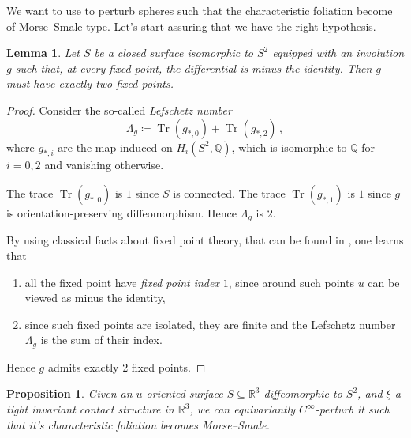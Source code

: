 \documentclass[a4paper, 11pt]{amsart}
\theoremstyle{plain}
\newtheorem{prop}{Proposition}[section]
\newtheorem{lemma}[lemma]{Lemma}
\theoremstyle{definition}
\newcommand{\R}{\mathbb{R}}
\DeclareMathOperator{\Tr}{Tr}
\begin{document}
We want to use  to perturb spheres such that the characteristic foliation become of Morse--Smale type. Let's start assuring that we have the right hypothesis.
\begin{lemma}\label{LefschetzS2}
	Let $S$ be a closed surface isomorphic to $S^2$ equipped with an involution $g$ such that, at every fixed point, the differential is minus the identity. Then $g$ must have exactly two fixed points.
\end{lemma}
\begin{proof}
	Consider the so-called \emph{Lefschetz number}
	\[
		\Lambda_g \coloneqq \Tr(g_{*,0}) + \Tr(g_{*,2})\,,
	\]
	where $g_{*,i}$ are the map induced on $H_i(S^2,\mathbb{Q})$, which is isomorphic to $\mathbb{Q}$ for $i = 0,2$ and vanishing otherwise.
	
	The trace $\Tr(g_{*,0})$ is $1$ since $S$ is connected. The trace $\Tr(g_{*,1})$ is $1$ since $g$ is orientation-preserving diffeomorphism. Hence $\Lambda_g$ is $2$.
	
	By using classical facts about fixed point theory, that can be found in \cite[Ch. VII]{albrechtlecturesonalgebraictopology}, one learns that
	\begin{enumerate}
		\item all the fixed point have \emph{fixed point index} $1$, since around such points $u$ can be viewed as minus the identity,
		\item since such fixed points are isolated, they are finite and the Lefschetz number $\Lambda_g$ is the sum of their index.
	\end{enumerate}
	Hence $g$ admits exactly 2 fixed points.
\end{proof}
\begin{prop}\label{CinftysurfMorseSmale}
	Given an $u$-oriented surface $S \subseteq \R^3$ diffeomorphic to $S^2$, and $\xi$ a tight invariant contact structure in $\R^3$, we can equivariantly $C^\infty$-perturb it such that it's characteristic foliation becomes Morse--Smale. 
\end{prop}
\end{document}
